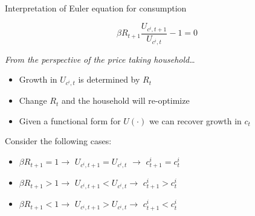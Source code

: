 
\begin{frame}{Interpretation of Euler equation for consumption}

\begin{equation*}
\beta R_{t+1}\frac{U_{c^{i},t+1}}{U_{c^{i},t}}-1=0
\end{equation*}

\textit{From the perspective of the price taking household}\ldots
\begin{itemize}
\item 	Growth in $U_{c^{i},t}$ is determined by $R_{t}$
\item	Change $R_{t}$ and the household will re-optimize
\item	Given a functional form for $U(\cdot)$ we can recover growth in $c_{t}$
\end{itemize}

\vspace{3mm}
Consider the following cases:
\begin{itemize}
\item $\beta R_{t+1}=1\rightarrow $ $U_{c^{i},t+1}=U_{c^{i},t}$ $\rightarrow$ $c_{t+1}^{i}=c_{t}^{i}$
\item $\beta R_{t+1}>1\rightarrow $ $U_{c^{i},t+1}<U_{c^{i},t}\rightarrow $ $c_{t+1}^{i}>c_{t}^{i}$
\item $\beta R_{t+1}<1\rightarrow $ $U_{c^{i},t+1}>U_{c^{i},t}\rightarrow $ $c_{t+1}^{i}<c_{t}^{i}$
\end{itemize}

\end{frame}


